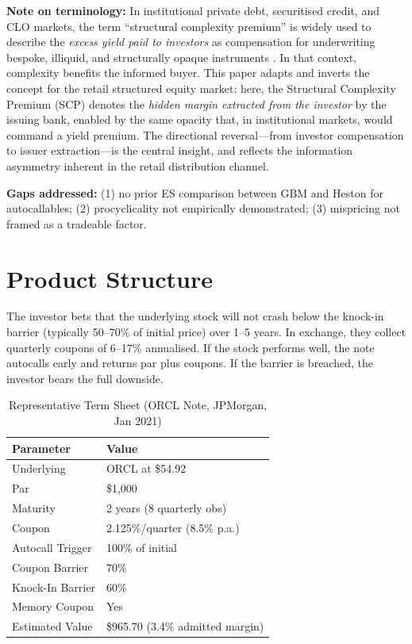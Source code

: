 \documentclass[10pt,a4paper]{article}
\begin{document}
\textbf{Note on terminology:} In institutional private debt, securitised credit, and CLO markets, the term ``structural complexity premium'' is widely used to describe the \emph{excess yield paid to investors} as compensation for underwriting bespoke, illiquid, and structurally opaque instruments \citep{celerier2017}. In that context, complexity benefits the informed buyer. This paper adapts and inverts the concept for the retail structured equity market: here, the Structural Complexity Premium (SCP) denotes the \emph{hidden margin extracted from the investor} by the issuing bank, enabled by the same opacity that, in institutional markets, would command a yield premium. The directional reversal---from investor compensation to issuer extraction---is the central insight, and reflects the information asymmetry inherent in the retail distribution channel.

\textbf{Gaps addressed:} (1) no prior ES comparison between GBM and Heston for autocallables; (2) procyclicality not empirically demonstrated; (3) mispricing not framed as a tradeable factor.

\newpage\section{Product Structure}\label{sec:product}
The investor bets that the underlying stock will not crash below the knock-in barrier (typically 50--70\% of initial price) over 1--5 years. In exchange, they collect quarterly coupons of 6--17\% annualised. If the stock performs well, the note autocalls early and returns par plus coupons. If the barrier is breached, the investor bears the full downside.

\begin{table}[H]\centering\small
\caption{Representative Term Sheet (ORCL Note, JPMorgan, Jan 2021)}
\begin{tabular}{@{}ll@{}}\toprule
\textbf{Parameter}&\textbf{Value}\\\midrule
Underlying&ORCL at \$54.92\\Par&\$1,000\\Maturity&2 years (8 quarterly obs)\\
Coupon&2.125\%/quarter (8.5\% p.a.)\\Autocall Trigger&100\% of initial\\
Coupon Barrier&70\%\\Knock-In Barrier&60\%\\Memory Coupon&Yes\\
Estimated Value&\$965.70 (3.4\% admitted margin)\\\bottomrule
\end{tabular}\end{table}
\end{document}

